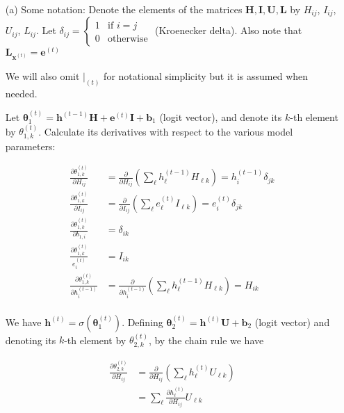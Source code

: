 \documentclass{article}
\begin{document}
\begin{itemize}
    \item[(a)]
    Some notation: Denote the elements of the matrices $\mathbf{H}, \mathbf{I}, \mathbf{U}, \mathbf{L}$ by $H_{ij}$, $I_{ij}$, $U_{ij}$, $L_{ij}$. Let $\delta_{ij} = \begin{cases} 1 & \text{if } i=j \\ 0 & \text{otherwise}\end{cases}$ (Kroenecker delta). Also note that $\mathbf{L}_{\mathbf{x}^(t)} = \mathbf{e}^{(t)}$
    
    We will also omit $\left. \right|_{(t)}$ for notational simplicity but it is assumed when needed.
    
    
    Let $\boldsymbol{\theta}^{(t)}_1 = \mathbf{h}^{(t-1)}\mathbf{H} + \mathbf{e}^{(t)}\mathbf{I} + \mathbf{b}_1$  (logit vector), and denote its $k$-th element by $\theta_{1,k}^{(t)}$. Calculate its derivatives with respect to the various model parameters:
    
    \begin{align*}
        \frac{\partial \theta^{(t)}_{1, k}}{\partial H_{ij}} &= \frac{\partial}{\partial H_{ij}} \left(\sum_{\ell}h^{(t-1)}_\ell H_{\ell k}\right) = h_i^{(t-1)} \delta_{jk}\\
        \frac{\partial \theta^{(t)}_{1,k}}{\partial I_{ij}} &= \frac{\partial}{\partial I_{ij}} \left(\sum_{\ell}e^{(t)}_\ell I_{\ell k}\right) = e_i^{(t)} \delta_{jk}\\
        \frac{\partial \theta^{(t)}_{1,k}}{\partial b_{1,i}} &= \delta_{ik}\\
        \frac{\partial \theta_{1,k}^{(t)}}{e^{(t)}_i} &= I_{ik}\\
        \frac{\partial \theta^{(t)}_{1, k}}{\partial h_i^{(t-1)}} &= \frac{\partial}{\partial h_i^{(t-1)}} \left(\sum_{\ell}h^{(t-1)}_\ell H_{\ell k}\right) = H_{ik}\\
    \end{align*}
    
    We have $\mathbf{h}^{(t)} = \sigma(\boldsymbol{\theta}_1^{(t)})$. Defining $\boldsymbol{\theta}^{(t)}_2 = \mathbf{h}^{(t)}\mathbf{U} + \mathbf{b}_2$ (logit vector) and denoting its $k$-th element by $\theta^{(t)}_{2,k}$, by the chain rule we have
    
    \begin{align*}
        \frac{\partial \theta_{2,k}^{(t)}}{\partial H_{ij}} &= \frac{\partial}{\partial H_{ij}} \left( \sum_\ell h_\ell^{(t)}U_{\ell k} \right) \\
        &= \sum_\ell \frac{\partial h_\ell^{(t)}}{\partial H_{ij}}U_{\ell k}
    \end{align*}
    

\end{itemize}
\end{document}
